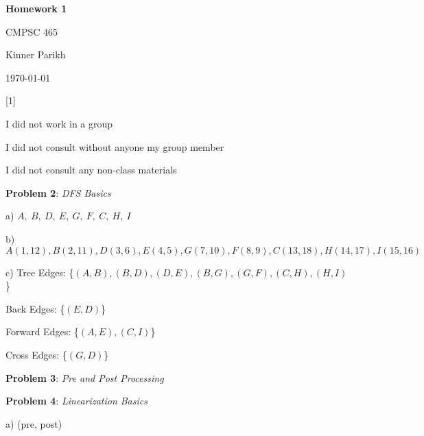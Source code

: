 \documentclass{article} %
\newcommand{\question}[2][]{\begin{flushleft}
        \textbf{Problem #1}: \textit{#2}

\end{flushleft}}
\newcommand{\maketitletwo}[2][]{\begin{center}
        \Large{\textbf{Homework #1}
            
            CMPSC 465} %
        \vspace{5pt}
        
        \normalsize{Kinner Parikh  %
        
        \today}        %
        \vspace{40pt}


        \newpage
        
\end{center}}
\begin{document}
    \maketitletwo[1]  %

    \question[1]{}
    \begin{center}
        
        I did not work in a group
    
        I did not consult without anyone my group member
    
        I did not consult any non-class materials
    \end{center}
    
    \newpage

    \question[2]{DFS Basics}

    a) $A,\ B,\ D,\ E,\ G,\ F,\ C,\ H,\ I$

    \vspace{5pt}

    b) $A(1, 12), B(2, 11), D(3, 6), E(4, 5), G(7, 10), F(8, 9), C(13, 18), H(14, 17), I(15, 16)$

    \vspace{5pt}

    c) Tree Edges: \hspace{16pt}\{$(A, B), (B, D), (D, E), (B, G), (G, F), (C, H), (H, I)$\}

    \hspace{12pt}Back Edges: \hspace{14pt}\{$(E, D)$\}

    \hspace{12pt}Forward Edges: \{$(A, E), (C, I)$\}

    \hspace{12pt}Cross Edges: \hspace{12pt}\{$(G, D)$\}

    \newpage

    \question[3]{Pre and Post Processing}

    \newpage

    \question[4]{Linearization Basics}

    a) (pre, post)
    
    \vspace{3pt}
\end{document}
